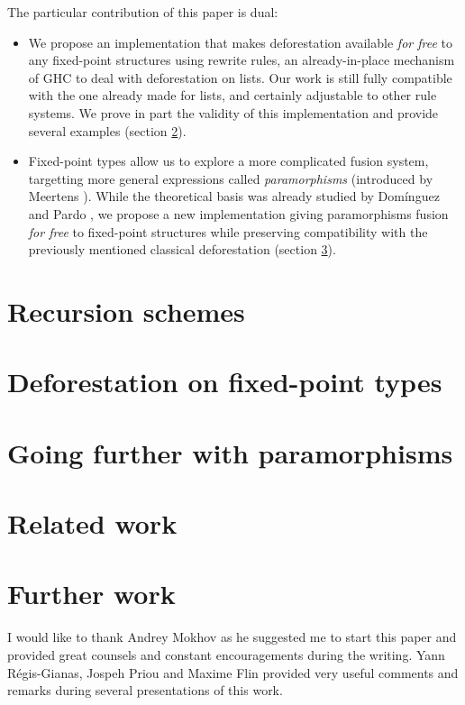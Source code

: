 \documentclass[format=sigplan, review=true, anonymous=true]{acmart}
\begin{document}
The particular contribution of this paper is dual:
\begin{itemize}
\item We propose an implementation that makes deforestation available \emph{for free} to any fixed-point structures using rewrite rules, an already-in-place mechanism of GHC to deal with deforestation on lists. Our work is still fully compatible with the one already made for lists, and certainly adjustable to other rule systems. We prove in part the validity of this implementation and provide several examples (section \ref{sec:rectypes}).
\item Fixed-point types allow us to explore a more complicated fusion system, targetting more general expressions called \emph{paramorphisms} (introduced by Meertens \cite{Meertens1992}). While the theoretical basis was already studied by Domínguez and Pardo \cite{paramorphismFusion}, we propose a new implementation giving paramorphisms fusion \emph{for free} to fixed-point structures while preserving compatibility with the previously mentioned classical deforestation (section \ref{sec:para}).
\end{itemize}

\section{Recursion schemes}
\label{sec:recschemes}


\section{Deforestation on fixed-point types}
\label{sec:rectypes}


\section{Going further with paramorphisms}
\label{sec:para}


\section{Related work}
\label{sec:related}


\section{Further work}
\label{sec:further}


\begin{acks}
I would like to thank Andrey Mokhov as he suggested me to start this paper and provided great counsels and constant encouragements during the writing. Yann Régis-Gianas, Jospeh Priou and Maxime Flin provided very useful comments and remarks during several presentations of this work.
\end{acks}



\end{document}
